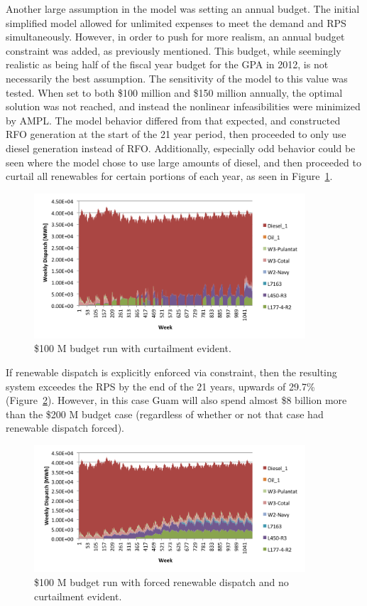 \documentclass[12pt,letterpaper,fleqn]{article}
\begin{document}
Another large assumption in the model was setting an annual
budget. The initial simplified model allowed for unlimited expenses to
meet the demand and RPS simultaneously. However, in order to push for
more realism, an annual budget constraint was added, as previously
mentioned. This budget, while seemingly realistic as being half of the
fiscal year budget for the GPA in 2012, is not necessarily the best
assumption. The sensitivity of the model to this value was
tested. When set to both \$100 million and \$150 million annually, the
optimal solution was not reached, and instead the nonlinear
infeasibilities were minimized by AMPL. The model behavior differed
from that expected, and constructed RFO generation at the start of the
21 year period, then proceeded to only use diesel generation instead
of RFO. Additionally, especially odd behavior could be seen where the
model chose to use large amounts of diesel, and then proceeded to
curtail all renewables for certain portions of each year, as seen in 
Figure~\ref{fig:budget_100_not_forced}.

\begin{figure}[!h]
  \centering
  \includegraphics[width=0.9\textwidth]{img/budget_100_not_forced}
  \caption{\$100 M budget run with curtailment evident.}
  \label{fig:budget_100_not_forced}
\end{figure}

If renewable dispatch is explicitly enforced via constraint, then the
resulting system exceedes the RPS by the end of the 21 years,
upwards of 29.7\% (Figure~\ref{fig:budget_100_forced}). 
However, in this case Guam will also spend almost
\$8 billion more than the \$200 M budget case (regardless of whether
or not that case had renewable dispatch forced).

\begin{figure}[!h]
  \centering
  \includegraphics[width=0.9\textwidth]{img/budget_100_forced}
  \caption{\$100 M budget run with forced renewable dispatch and no
    curtailment evident.}
  \label{fig:budget_100_forced}
\end{figure}
\end{document}
